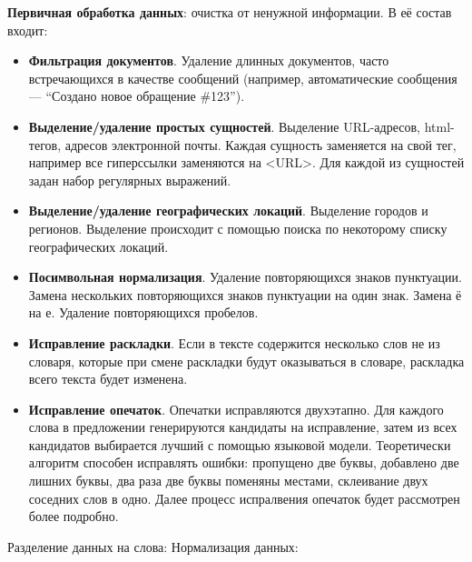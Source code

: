 \textbf{Первичная обработка данных}: очистка от ненужной информации. В её состав входит:
\begin{itemize}
    \item  \textbf{Фильтрация документов}. Удаление длинных документов, часто встречающихся в качестве сообщений (например, автоматические сообщения — ``Создано новое обращение \#123''). 
    \item \textbf{Выделение/удаление простых сущностей}. Выделение URL-адресов, html-тегов, адресов электронной почты. Каждая сущность заменяется на свой тег, например все гиперссылки заменяются на <URL>. Для каждой из сущностей задан набор регулярных выражений.
\item \textbf{Выделение/удаление географических локаций}. Выделение городов и регионов. Выделение происходит с помощью поиска по некоторому списку географических локаций.
\item \textbf{Посимвольная нормализация}. Удаление повторяющихся знаков пунктуации. Замена нескольких повторяющихся знаков пунктуации на один знак. Замена ё на е. Удаление повторяющихся пробелов.
\item \textbf{Исправление раскладки}. Если в тексте содержится несколько слов не из словаря, которые при смене раскладки будут оказываться в словаре, раскладка всего текста будет изменена.
\item \textbf{Исправление опечаток}. Опечатки исправляются двухэтапно. Для каждого слова в предложении генерируются кандидаты на исправление, затем из всех кандидатов выбирается лучший с помощью языковой модели. Теоретически алгоритм способен исправлять ошибки: пропущено две буквы, добавлено две лишних буквы, два раза две буквы поменяны местами, склеивание двух соседних слов в одно. Далее процесс испралвения опечаток будет рассмотрен более подробно.
\end{itemize}

Разделение данных на слова:
Нормализация данных:


